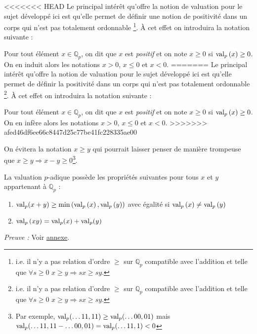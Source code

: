 <<<<<<< HEAD
Le principal intérêt qu'offre la notion de valuation pour le sujet développé ici est qu'elle permet de définir une notion de positivité dans un corps qui n'est pas totalement ordonnable \footnote{i.e. il n'y a pas relation d'ordre $\ge $ sur $\mathbb{Q}_{p}$ compatible avec l'addition et telle que $\forall s\ge 0$ $x\ge y \Rightarrow sx\ge sy$.}. À cet effet on introduira la notation suivante :
\begin{notation}
	Pour tout élément $x \in \mathbb{Q}_{p} $, on dit que $x$ est \hypertarget{positif}{\textit{positif}} et on note $x\ge 0$ si $\text{val}_p\left(x\right)\ge 0$. On en induit alors les notations $x> 0$, $x\le 0$ et $x<0$.  
=======
Le principal intérêt qu'offre la notion de valuation pour le sujet développé ici est qu'elle permet de définir la positivité dans un corps qui n'est pas totalement ordonnable \footnote{i.e. il n'y a pas relation d'ordre $\ge $ sur $\mathbb{Q}_{p}$ compatible avec l'addition et telle que $\forall s\ge 0$ $x\ge y \Rightarrow sx\ge sy$.}. À cet effet on introduira la notation suivante :
\begin{notation}
	Pour tout élément $x \in \mathbb{Q}_{p} $, on dit que $x$ est \hypertarget{positif}{\textit{positif}} et on note $x\ge 0$ si $\text{val}_p\left(x\right)\ge 0$. On en infère alors les notations $x> 0$, $x\le 0$ et $x<0$.  
>>>>>>> afed46df6ee66c8447d25c77be41fc228335ae00
\end{notation}

        On évitera la notation $x\ge y$ qui pourrait laisser penser de manière trompeuse que $x\ge y \Rightarrow x-y\ge 0$\footnote{Par exemple, $\text{val}_p(\ldots11,11) \ge \text{val}_p(\ldots00,01) $ mais $\text{val}_p(\ldots11,11 - \ldots00,01) = \text{val}_p( \ldots 11,1) < 0$}.

\begin{propriete}
	La valuation $p$-adique possède les propriétés suivantes pour tous $x$ et $y$ appartenant à $\mathbb{Q}_{p} $ :
	\begin{enumerate}
<<<<<<< HEAD
		\label{propval} 
=======
		\label{propval}
>>>>>>> afed46df6ee66c8447d25c77be41fc228335ae00
		\item $\text{val}_p(x+y) \ge \min\left( \text{val}_p\left( x \right), \text{val}_p\left( y \right)  \right) $ avec égalité si $\text{val}_p\left(x\right) \neq \text{val}_p\left(y\right)$
		\item $\text{val}_p\left( xy \right) = \text{val}_p (x) + \text{val}_p( y)$ 
	\end{enumerate}
\end{propriete}
\textit{Preuve :} Voir \hyperlink{propvalpreuve}{annexe}.   


\end{notation}
